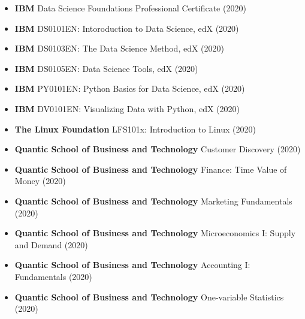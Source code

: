 \documentclass[11pt,letterpaper,sans]{moderncv} %
\begin{document}
\begin{itemize}

	\item \textbf{IBM} Data Science Foundations Professional Certificate (2020)
	\item \textbf{IBM} DS0101EN: Intoroduction to Data Science, edX (2020)
	\item \textbf{IBM} DS0103EN: The Data Science Method, edX (2020)
	\item \textbf{IBM} DS0105EN: Data Science Tools, edX (2020)
	\item \textbf{IBM} PY0101EN: Python Basics for Data Science, edX (2020)
	\item \textbf{IBM} DV0101EN: Visualizing Data with Python, edX (2020)
	\item \textbf{The Linux Foundation} LFS101x: Introduction to Linux (2020)
	\item \textbf{Quantic School of Business and Technology} Customer Discovery (2020)
	\item \textbf{Quantic School of Business and Technology} Finance: Time Value of Money (2020)
        \item \textbf{Quantic School of Business and Technology} Marketing Fundamentals (2020)
	\item \textbf{Quantic School of Business and Technology} Microeconomics I: 
								   Supply and Demand (2020)
	\item \textbf{Quantic School of Business and Technology} Accounting I: Fundamentals (2020)
	\item \textbf{Quantic School of Business and Technology} One-variable Statistics (2020)
	

\end{itemize}






\end{document}
